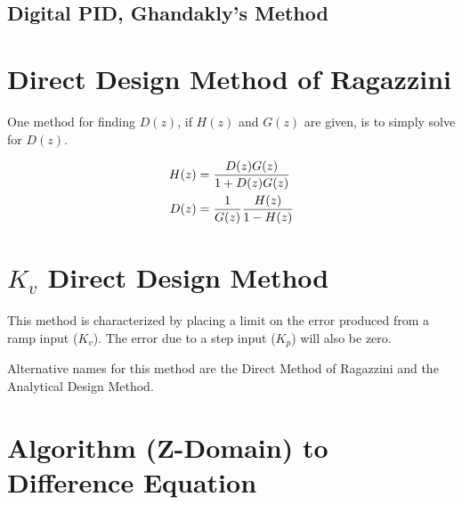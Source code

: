 \documentclass{article}
\newcommand{\sincludepdf}[2][]{
	
}
\begin{document}
\sincludepdf[pages={9},
			pagecommand=\subsubsection*{Example 4}
		]{scan/11221301.pdf}

\subsection{Digital PID, Ghandakly's Method}


\section{Direct Design Method of Ragazzini}

One method for finding $D(z)$, if $H(z)$ and $G(z)$ are given,
is to simply solve for $D(z)$\autocite[Pg. 265]{franklin1998digital}.

\begin{align}
	H(z) &= \frac{D(z)G(z)}{1 + D(z)G(z)} \notag \\
	D(z) &= \frac{1}{G(z)} \frac{H(z)}{1 - H(z)}
\end{align}


\section{$K_v$ Direct Design Method}

This method is characterized by placing a limit on the error
produced from a ramp input ($K_v$).
The error due to a step input ($K_p$) will also be zero.

Alternative names for this method are the Direct Method
of Ragazzini\autocite[Pg. 264]{franklin1998digital} and
the Analytical Design Method\autocite[Pg. 242]{ogata1995discrete}.

\section{Algorithm (Z-Domain) to Difference Equation}

\sincludepdf[pages={11},
			pagecommand=\subsection*{Example 1}
		]{scan/11211301.pdf}
\end{document}
